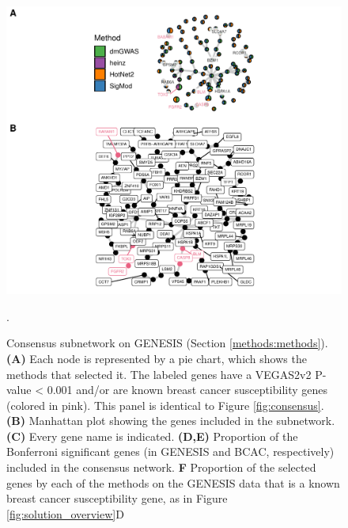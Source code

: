 \documentclass[twocolumn, 11pt, draft]{article}
\begin{document}
\begin{figure}[htbp]
\centering
\includegraphics[width=.9\linewidth]{./figures/sfigure_4.pdf}
\caption{\label{sfig:consensus_names}
Consensus subnetwork on GENESIS (Section \ref{methods:methods}). \textbf{(A)} Each node is represented by a pie chart, which shows the methods that selected it. The labeled genes have a VEGAS2v2 P-value < 0.001 and/or are known breast cancer susceptibility genes (colored in pink). This panel is identical to Figure \ref{fig:consensus}. \textbf{(B)} Manhattan plot showing the genes included in the subnetwork. \textbf{(C)} Every gene name is indicated. \textbf{(D,E)} Proportion of the Bonferroni significant genes (in GENESIS and BCAC, respectively) included in the consensus network. \textbf{F} Proportion of the selected genes by each of the methods on the GENESIS data that is a known breast cancer susceptibility gene, as in Figure \ref{fig:solution_overview}D}.
\end{figure}
\end{document}
